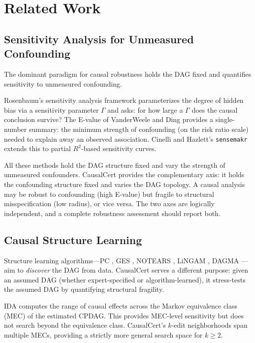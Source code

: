 \documentclass[11pt,a4paper]{article}
\theoremstyle{definition}
\theoremstyle{remark}
\begin{document}
\section{Related Work}\label{sec:related}

\subsection{Sensitivity Analysis for Unmeasured Confounding}

The dominant paradigm for causal robustness holds the DAG fixed and quantifies
sensitivity to unmeasured confounding.

Rosenbaum's sensitivity analysis framework \cite{rosenbaum2002} parameterizes the
degree of hidden bias via a sensitivity parameter $\Gamma$ and asks: for how large a
$\Gamma$ does the causal conclusion survive? The E-value of VanderWeele and Ding
\cite{vanderweele2017} provides a single-number summary: the minimum strength of
confounding (on the risk ratio scale) needed to explain away an observed association.
Cinelli and Hazlett's \texttt{sensemakr} \cite{cinelli2020} extends this to partial
$R^2$-based sensitivity curves.

All these methods hold the DAG structure fixed and vary the strength of unmeasured
confounders. CausalCert provides the complementary axis: it holds the confounding
structure fixed and varies the DAG topology. A causal analysis may be robust to
confounding (high E-value) but fragile to structural misspecification (low radius), or
vice versa. The two axes are logically independent, and a complete robustness assessment
should report both.

\subsection{Causal Structure Learning}

Structure learning algorithms---PC \cite{spirtes2000}, GES \cite{chickering2002},
NOTEARS \cite{zheng2018}, LiNGAM \cite{shimizu2006}, DAGMA \cite{bello2022}---aim to
\emph{discover} the DAG from data. CausalCert serves a different purpose: given an
assumed DAG (whether expert-specified or algorithm-learned), it stress-tests the
assumed DAG by quantifying structural fragility.

IDA \cite{maathuis2009} computes the range of causal effects across the Markov
equivalence class (MEC) of the estimated CPDAG. This provides MEC-level sensitivity
but does not search beyond the equivalence class. CausalCert's $k$-edit neighborhoods
span multiple MECs, providing a strictly more general search space for $k \geq 2$.
\end{document}
